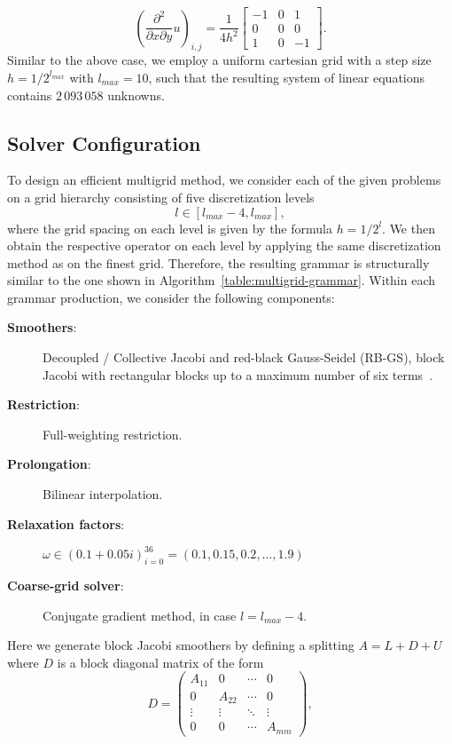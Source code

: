 \begin{equation*}
	\left(\frac{\partial^2}{\partial x \partial y} u\right)_{i,j} = 
	\frac{1}{4 h^2} \begin{bmatrix}
		-1 & 0 & 1\\
		0 & 0 & 0 \\
		1 & 0 & -1  
	\end{bmatrix}.
\end{equation*}
Similar to the above case, we employ a uniform cartesian grid with a step size $h = 1/2^{l_{max}}$ with $l_{max} = 10$, such that the resulting system of linear equations contains $2\,093\,058$ unknowns.
\subsection{Solver Configuration}
\label{sec:experiments1-multigrid-configuration}
To design an efficient multigrid method, we consider each of the given problems on a grid hierarchy consisting of five discretization levels 
\begin{equation*}
    l \in \left[l_{max} - 4, l_{max}\right],
\end{equation*} where the grid spacing on each level is given by the formula $h = 1/2^l$.
We then obtain the respective operator on each level by applying the same discretization method as on the finest grid.
Therefore, the resulting grammar is structurally similar to the one shown in Algorithm~\ref{table:multigrid-grammar}.
Within each grammar production, we consider the following components:
\begin{description}
	\item[\textbf{Smoothers}:] Decoupled / Collective Jacobi and red-black Gauss-Seidel (RB-GS), block Jacobi with rectangular blocks up to a maximum number of six terms~\cite{trottenberg2000multigrid}.
	\item[\textbf{Restriction}:] Full-weighting restriction.
	\item[\textbf{Prolongation}:] Bilinear interpolation.
	\item[\textbf{Relaxation factors}:] $\omega \in \left( 0.1 + 0.05i \right)_{i = 0}^{36} = \left(0.1, 0.15, 0.2, \dots, 1.9 \right)$
	\item[\textbf{Coarse-grid solver}:] Conjugate gradient method, in case $l = l_{max} - 4$.
\end{description}
Here we generate block Jacobi smoothers by defining a splitting $A = L + D + U$ where $D$ is a block diagonal matrix of the form
\begin{equation*}
	D = 
		\begin{pmatrix}A_{11}&0&\cdots &0\\
			0&A_{22}&\cdots &0\\
			\vdots &\vdots &\ddots &\vdots \\0&0&\cdots &A_{mm}\end{pmatrix},
\end{equation*}
